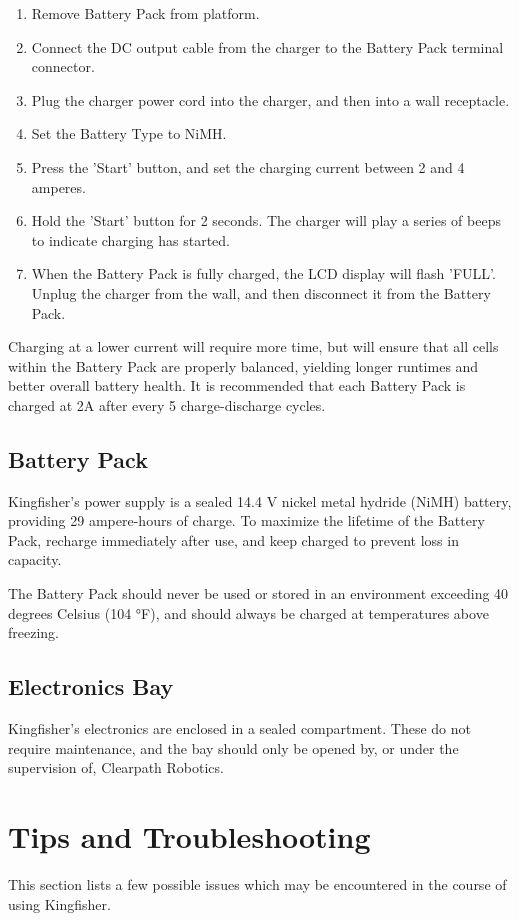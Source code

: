 \documentclass[]{clearpath-latex/clearpath-manual}
\begin{document}
\begin{enumerate}[nolistsep]
\begin{enumerate}[nolistsep]
\begin{enumerate}[nolistsep]
	\item Remove Battery Pack from platform.
	\item Connect the DC output cable from the charger to the Battery Pack terminal connector.
	\item Plug the charger power cord into the charger, and then into a wall receptacle.
	\item Set the Battery Type to NiMH.
	\item Press the 'Start' button, and set the charging current between 2 and 4 amperes.
	\item Hold the 'Start' button for 2 seconds. The charger will play a series of beeps to indicate charging has started.
	\item When the Battery Pack is fully charged, the LCD display will flash 'FULL'. Unplug the charger from the wall, and then disconnect it from the Battery Pack.
\end{enumerate}

Charging at a lower current will require more time, but will ensure that all cells within the Battery Pack are properly balanced, yielding longer runtimes and better overall battery health. It is recommended that each Battery Pack is charged at 2A after every 5 charge-discharge cycles.

\subsection{Battery Pack}
Kingfisher’s power supply is a sealed 14.4 V nickel metal hydride (NiMH) battery, providing 29 ampere-hours of charge. To maximize the lifetime of the Battery Pack, recharge immediately after use, and keep charged to prevent loss in capacity.

The Battery Pack should never be used or stored in an environment exceeding 40 degrees Celsius (104 °F), and should always be charged at temperatures above freezing.

\subsection{Electronics Bay}
Kingfisher's electronics are enclosed in a sealed compartment. These do not require maintenance, and the bay should only be opened by, or under the supervision of, Clearpath Robotics.

\section{Tips and Troubleshooting}
This section lists a few possible issues which may be encountered in the course of using Kingfisher.


\end{enumerate}
\end{enumerate}
\end{document}
